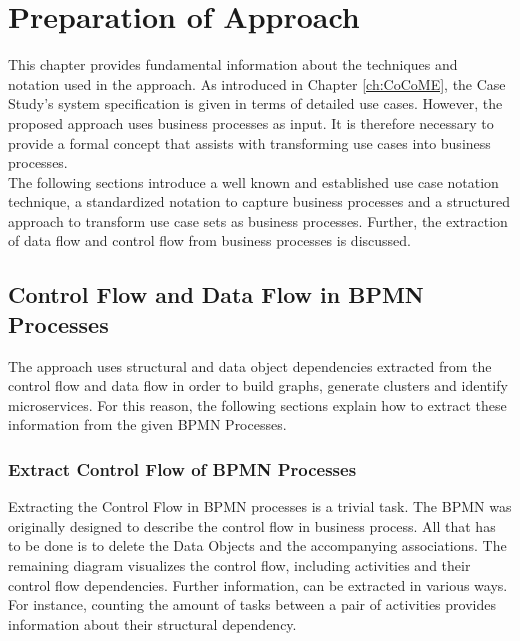 \chapter{Preparation of Approach}
\label{ch:PrepApproach}
This chapter provides fundamental information about the techniques and notation used in the approach. As introduced in Chapter \ref{ch:CoCoME}, the Case Study's system specification is given in terms of detailed use cases. However, the proposed approach uses business processes as input. It is therefore necessary to provide a formal concept that assists with transforming use cases into business processes. \\
The following sections introduce a well known and established use case notation technique, a standardized notation to capture business processes and a structured approach to transform use case sets as business processes. Further, the extraction of data flow and control flow from business processes is discussed.










\section{Control Flow and Data Flow in BPMN Processes}
\label{ch:PrepApproach:ControlDataFlowBPMNProcess}
The approach uses structural and data object dependencies extracted from the control flow and data flow in order to build graphs, generate clusters and identify microservices. For this reason, the following sections explain how to extract these information from the given BPMN Processes. 

\subsection{Extract Control Flow of BPMN Processes}
Extracting the Control Flow in BPMN processes is a trivial task. The BPMN was originally designed to describe the control flow in business process. All that has to be done is to delete the Data Objects and the accompanying associations. The remaining diagram visualizes the control flow, including activities and their control flow dependencies. Further information, can be extracted in various ways. For instance, counting the amount of tasks between a pair of activities provides information about their structural dependency.

